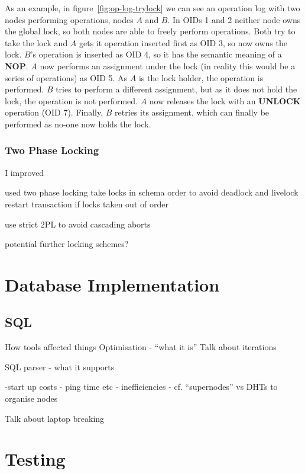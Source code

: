 \documentclass[12pt,twoside,notitlepage]{report}
\newcommand{\op}[1]  {{\bf #1}}         %
\begin{document}
As an example, in figure~\ref{fig:op-log-trylock} we can see an operation log with two nodes
performing operations, nodes $A$ and $B$. In OIDs 1 and 2 neither node owns the global lock, so both
nodes are able to freely perform operations. Both try to take the lock and $A$ gets it operation
inserted first as OID 3, so now owns the lock. $B$'s operation is inserted as OID 4, so it has the
semantic meaning of a \op{NOP}. $A$ now performs an assignment under the lock (in reality this
would be a series of operations) as OID 5. As $A$ is the lock holder, the operation is performed.
$B$ tries to perform a different assignment, but as it does not hold the lock, the operation is
not performed. $A$ now releases the lock with an \op{UNLOCK} operation (OID 7). Finally, $B$
retries its assignment, which can finally be performed as no-one now holds the lock.

\subsubsection{Two Phase Locking}

I improved 

used two phase locking
take locks in schema order to avoid deadlock and livelock
restart transaction if locks taken out of order

use strict 2PL to avoid cascading aborts

potential further locking schemes?

\section{Database Implementation}

\subsection{SQL}



How tools affected things
Optimisation - ``what it is''
Talk about iterations

SQL parser
- what it supports

-start up costs
  - ping time etc
  - inefficiencies
  - cf. ``supernodes'' vs DHTs to organise nodes

Talk about laptop breaking

\section{Testing}
\end{document}
